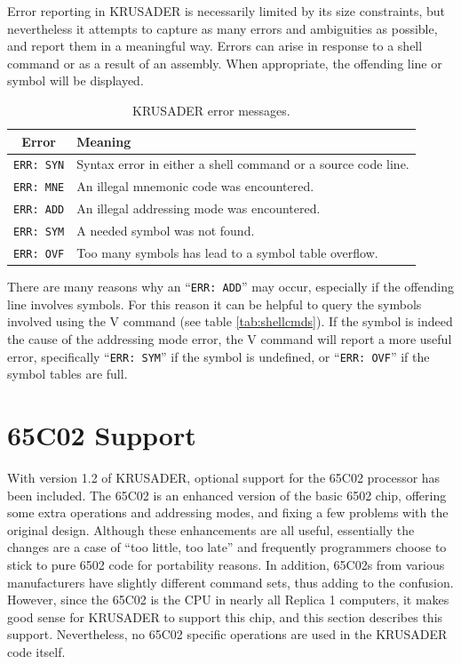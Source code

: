 \documentclass[12pt]{article}
\newcommand{\replica}[1]{\textsf{#1}}
\newcommand{\krusader}{\textsf{KRUSADER}\xspace}
\begin{document}
Error reporting in \krusader is necessarily limited by its size constraints,
but nevertheless it attempts to capture as many errors and ambiguities as
possible, and report them in a meaningful way.  Errors can arise in response
to a shell command or as a result of an assembly.  When appropriate, the 
offending line or symbol will be displayed.
\begin{table}[htb]
	\centering
	\begin{tabular}{|c|p{12cm}|} \hline
	\textbf{Error} & \textbf{Meaning} \tabularnewline
	\hline
	\texttt{ERR: SYN} & Syntax error in either a shell command or a source code line.\tabularnewline\hline
	\texttt{ERR: MNE} & An illegal mnemonic code was encountered.\tabularnewline\hline
	\texttt{ERR: ADD} & An illegal addressing mode was encountered.\tabularnewline\hline
	\texttt{ERR: SYM} & A needed symbol was not found.\tabularnewline\hline
	\texttt{ERR: OVF} & Too many symbols has lead to a symbol table overflow.\tabularnewline\hline
	\end{tabular}
	\caption{\krusader error messages.}
	\label{tab:errors}
\end{table}

\pagebreak

There are many reasons why an ``\texttt{ERR: ADD}'' may occur, especially if the offending
line involves symbols.  For this reason it can be helpful to query the symbols involved
using the \replica{V} command (see table \ref{tab:shellcmds}).  If the symbol is indeed
the cause of the addressing mode error, the \replica{V} command will report a more useful
error, specifically ``\texttt{ERR: SYM}'' if the symbol is undefined, or ``\texttt{ERR: OVF}'' if
the symbol tables are full.

\section{65C02 Support}
\label{sec:65C02}

With version 1.2 of \krusader, optional support for the 65C02 processor has been included.  
The 65C02 is an enhanced version of the basic 6502 chip, offering some extra operations
and addressing modes, and fixing a few problems with the original design.  Although these
enhancements are all useful, essentially the changes are a case of ``too little, too late'' and
frequently programmers choose to stick to pure 6502 code for portability reasons.
In addition, 65C02s from various manufacturers have slightly different command sets, thus
adding to the confusion.
However, since the 65C02 is the CPU in nearly all Replica 1 computers, it makes good sense
for \krusader to support this chip, and this section describes this support.
Nevertheless, no 65C02 specific operations are used in the \krusader code itself.
\end{document}
